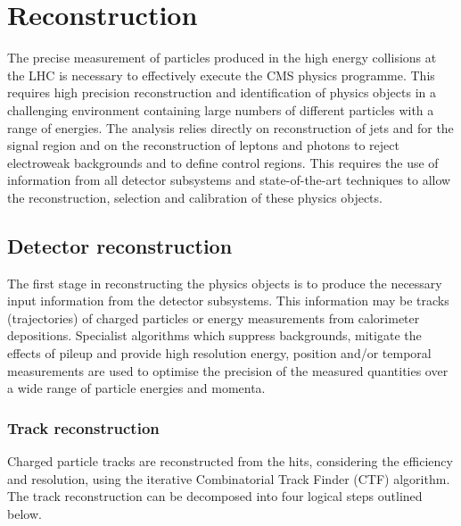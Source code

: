 \chapter{Reconstruction} %
\label{cha:reco}

The precise measurement of particles produced in the high energy collisions at the LHC 
is necessary to effectively execute the CMS physics programme. This requires high precision
reconstruction and identification of physics objects in a challenging environment containing
large numbers of different particles with a range of energies. The \alphat analysis 
relies directly on reconstruction of jets and \met for the signal region and on the 
reconstruction of leptons and photons to reject electroweak 
backgrounds and to define control regions.
This requires the use of information from all detector subsystems and state-of-the-art
techniques to allow the reconstruction, selection and calibration of these physics objects.


\section{Detector reconstruction}

The first stage in reconstructing the physics objects is to produce the necessary
input information from the detector subsystems. This information may be tracks
(trajectories) of charged particles or energy measurements from calorimeter depositions. 
Specialist algorithms which suppress backgrounds, mitigate the effects of pileup and provide high resolution energy,
position and/or temporal measurements are used to optimise the precision of the 
measured quantities over a wide range of particle energies and momenta.

\subsection{Track reconstruction}

Charged particle tracks are reconstructed from the hits, considering the efficiency and resolution, 
using the iterative Combinatorial Track Finder (CTF) algorithm. The track reconstruction can be decomposed 
into four logical steps outlined below.

